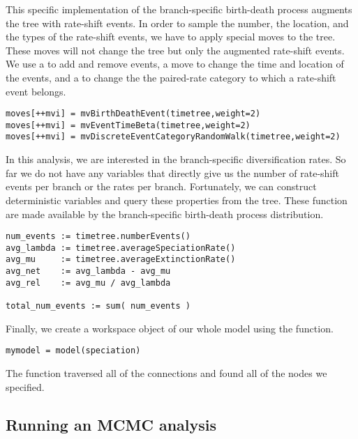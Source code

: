 This specific implementation of the branch-specific birth-death process augments the tree with rate-shift events.
In order to sample the number, the location, and the types of the rate-shift events, we have to apply special moves to the tree.
These moves will not change the tree but only the augmented rate-shift events.
We use a  to add and remove events, a  move to change the time and location of the events,
and a  to change the the paired-rate category to which a rate-shift event belongs.
{\tt \begin{snugshade*}
\begin{lstlisting}
moves[++mvi] = mvBirthDeathEvent(timetree,weight=2)
moves[++mvi] = mvEventTimeBeta(timetree,weight=2)
moves[++mvi] = mvDiscreteEventCategoryRandomWalk(timetree,weight=2)
\end{lstlisting}
\end{snugshade*}}

In this analysis, we are interested in the branch-specific diversification rates.
So far we do not have any variables that directly give us the number of rate-shift events per branch or the rates per branch.
Fortunately, we can construct deterministic variables and query these properties from the tree.
These function are made available by the branch-specific birth-death process distribution.
{\tt \begin{snugshade*}
\begin{lstlisting}
num_events := timetree.numberEvents()
avg_lambda := timetree.averageSpeciationRate()
avg_mu     := timetree.averageExtinctionRate()
avg_net    := avg_lambda - avg_mu
avg_rel    := avg_mu / avg_lambda

total_num_events := sum( num_events )
\end{lstlisting}
\end{snugshade*}}


Finally, we create a workspace object of our whole model using the  function.
{\tt \begin{snugshade*}
\begin{lstlisting}
mymodel = model(speciation)
\end{lstlisting}
\end{snugshade*}}

The  function traversed all of the connections and found all of the nodes we specified.


\subsection{Running an MCMC analysis}

